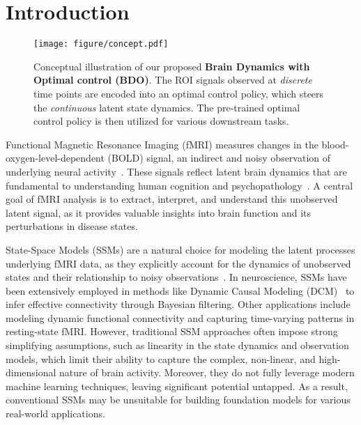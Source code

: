 \section{Introduction}
\label{sec:main:introduction}

\begin{figure}[!t]
\centering
\texttt{[image: figure/concept.pdf]}
\vspace{-5mm}
\caption{Conceptual illustration of our proposed \textbf{Brain Dynamics with Optimal control (BDO)}. The ROI signals observed at \textit{discrete} time points are encoded into an optimal control policy, which steers the \textit{continuous} latent state dynamics. The pre-trained optimal control policy is then utilized for various downstream tasks.}
\vspace{-6mm}
\end{figure}


Functional Magnetic Resonance Imaging (fMRI) measures changes in the blood-oxygen-level-dependent (BOLD) signal, an indirect and noisy observation of underlying neural activity~\citep{doi:10.1073/pnas.87.24.9868}. These signals reflect latent brain dynamics that are fundamental to understanding human cognition and psychopathology~\citep{LeeEtAl2022b, CaiEtAl2021, TaghiaEtAl2018}. A central goal of fMRI analysis is to extract, interpret, and understand this unobserved latent signal, as it provides valuable insights into brain function and its perturbations in disease states.

State-Space Models (SSMs) are a natural choice for modeling the latent processes underlying fMRI data, as they explicitly account for the dynamics of unobserved states and their relationship to noisy observations~\citep{FRISTON20031273, 10.1093/nsr/nwae079}. In neuroscience, SSMs have been extensively employed in methods like Dynamic Causal Modeling (DCM)~\citep{FRISTON20031273,triantafyllopoulos2021bayesian} to infer effective connectivity through Bayesian filtering. Other applications include modeling dynamic functional connectivity and capturing time-varying patterns in resting-state fMRI. However, traditional SSM approaches often impose strong simplifying assumptions, such as linearity in the state dynamics and observation models, which limit their ability to capture the complex, non-linear, and high-dimensional nature of brain activity. Moreover, they do not fully leverage modern machine learning techniques, leaving significant potential untapped. As a result, conventional SSMs may be unsuitable for building foundation models for various real-world applications.

